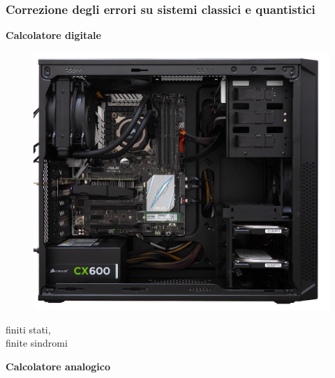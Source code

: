 \documentclass[aspectratio=169]{beamer}
\begin{document}
\begin{frame}
	\frametitle{Correzione degli errori su sistemi classici e quantistici}

	\begin{minipage}{0.32\textwidth}
		\centering
		\textbf{Calcolatore digitale}
		\begin{figure}
			\includegraphics[scale=0.215]{digitale.jpg}
		\end{figure}
		finiti stati, \\
		finite sindromi
	\end{minipage}
	\pause
	\begin{minipage}{0.32\textwidth}
		\centering
		\textbf{Calcolatore analogico}
		\begin{figure}

\end{figure}
\end{minipage}
\end{frame}
\end{document}
